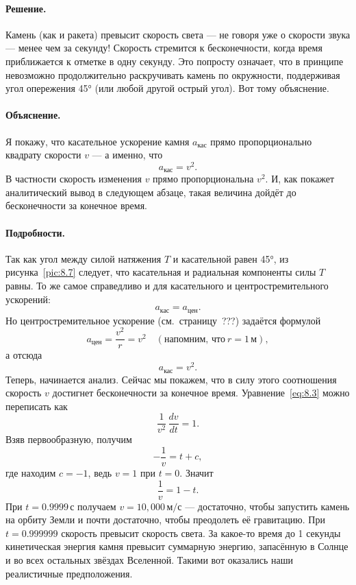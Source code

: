 \paragraph{Решение.}
Камень (как и ракета) превысит скорость света --- не говоря уже о скорости звука --- менее чем за секунду!
Скорость стремится к бесконечности, когда время приближается к отметке в одну секунду.
Это попросту означает, что в принципе невозможно продолжительно раскручивать камень по окружности, поддерживая угол опережения 45° (или любой другой острый угол).
Вот тому объяснение.

\paragraph{Объяснение.}
Я покажу, что касательное ускорение камня $a_{\text{кас}}$ прямо пропорционально квадрату скорости $v$ ---
а именно, что
\[
a_{\text{кас}} = v^{2}.
\]
В частности скорость изменения $v$ прямо пропорциональна $v^2$.
И, как покажет аналитический вывод в следующем абзаце, такая величина дойдёт до бесконечности за конечное время.

\paragraph{Подробности.}
Так как угол между силой натяжения $T$ и касательной равен 45°,
из рисунка~\ref{pic:8.7} следует, что касательная и радиальная компоненты силы $T$ равны.
То же самое справедливо и для касательного и центростремительного ускорений:
\[
a_{\text{кас}} = a_{\text{цен}}.
\]
Но центростремительное ускорение (см.~страницу~???) задаётся формулой
\[
a_{\text{цен}} = \frac{v^2}{r} = v^2 \quad (\text{напомним, что}\  r = 1\,\text{м}),
\]
а отсюда
\begin{equation}
a_{\text{кас}} = v^2. \label{eq:8.3}
\end{equation}
Теперь, начинается анализ.
Сейчас мы покажем, что в силу этого соотношения
скорость $v$ достигнет бесконечности за конечное время.
Уравнение~\eqref{eq:8.3} можно переписать как
\begin{equation}
\frac{1}{v^2}\,\frac{dv}{dt} = 1. \label{eq:8.4}
\end{equation}
Взяв первообразную, получим
\[
-\frac{1}{v} = t + c,
\]
где находим $c = -1$, ведь $v = 1$ при $t = 0$.
Значит
\[
\frac{1}{v} = 1 - t.
\]
При $t = 0.9999 \,\text{с}$ получаем $v = 10{,}000 \,\text{м/с}$ ---
достаточно, чтобы запустить камень на орбиту Земли и почти достаточно,
чтобы преодолеть её гравитацию.
При $t = 0.999999$ скорость превысит скорость света.
За какое-то время до 1 секунды кинетическая энергия камня
превысит суммарную энергию, запасённую в Солнце и во всех остальных
звёздах Вселенной.
Такими вот оказались наши реалистичные предположения.

